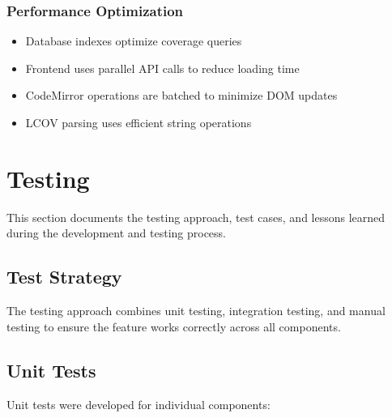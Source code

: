 \subsubsection{Performance Optimization}

\begin{itemize}
    \item Database indexes optimize coverage queries
    \item Frontend uses parallel API calls to reduce loading time
    \item CodeMirror operations are batched to minimize DOM updates
    \item LCOV parsing uses efficient string operations
\end{itemize}

\section{Testing}

This section documents the testing approach, test cases, and lessons learned during the development and testing process.

\subsection{Test Strategy}

The testing approach combines unit testing, integration testing, and manual testing to ensure the feature works correctly across all components.

\subsection{Unit Tests}

Unit tests were developed for individual components:

